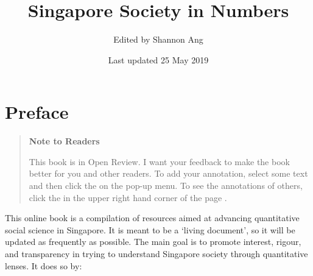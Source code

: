\documentclass[openany]{book}
\title{Singapore Society in Numbers}
\author{Edited by Shannon Ang}
\date{Last updated 25 May 2019}
\begin{document}
\maketitle

{
\setcounter{tocdepth}{1}
\tableofcontents
}
\chapter*{Preface}\label{preface}

\begin{quote}
\textbf{Note to Readers}

This book is in Open Review. I want your feedback to make the book
better for you and other readers. To add your annotation, {select some
text} and then click the on the pop-up menu. To see the annotations of
others, click the in the upper right hand corner of the page .
\end{quote}

This online book is a compilation of resources aimed at advancing
quantitative social science in Singapore. It is meant to be a `living
document', so it will be updated as frequently as possible. The main
goal is to promote interest, rigour, and transparency in trying to
understand Singapore society through quantitative lenses. It does so by:
\end{document}
